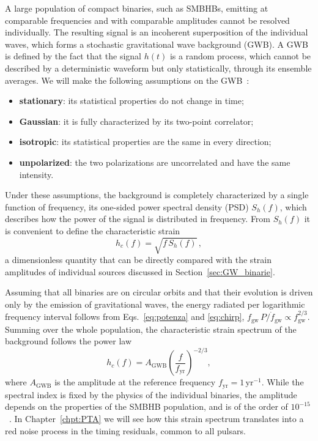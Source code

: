 A large population of compact binaries, such as SMBHBs, emitting at comparable
frequencies and with comparable amplitudes cannot be resolved individually.
The resulting signal is an incoherent superposition of the individual waves,
which forms a stochastic gravitational wave background (GWB).
A GWB is defined by the fact that the
signal $h(t)$ is a random process, which cannot be described by a
deterministic waveform but only statistically, through its ensemble averages.
We will make the following assumptions on the GWB~\cite{Maggiore2008}:
\begin{itemize}
    \item \textbf{stationary}: its statistical properties do not change in time;
    \item \textbf{Gaussian}: it is fully characterized by its two-point correlator;
    \item \textbf{isotropic}: its statistical properties are the same in every direction;
    \item \textbf{unpolarized}: the two polarizations are uncorrelated and have the same intensity.
\end{itemize}

Under these assumptions, the background is completely characterized by a
single function of frequency, its one-sided power spectral density (PSD)
$S_h(f)$, which describes how the power of the signal is distributed in
frequency. From $S_h(f)$ it is convenient to define the characteristic strain~\cite{Taylor2021}
\begin{equation}
    h_c(f) = \sqrt{f\,S_h(f)}\,,
    \label{eq:hc}
\end{equation}
a dimensionless quantity that can be directly compared with the strain
amplitudes of individual sources discussed in Section~\ref{sec:GW_binarie}.

Assuming that all binaries are on circular orbits and that their evolution is
driven only by the emission of gravitational waves, the energy radiated per
logarithmic frequency interval follows from Eqs.~\eqref{eq:potenza} and
\eqref{eq:chirp}, \mbox{$f_{\mathrm{gw}}\,P/\dot f_{\mathrm{gw}} \propto f_{\mathrm{gw}}^{2/3}$}. Summing over the whole
population, the characteristic strain spectrum of the background follows the
power law~\cite{Phinney2001,Taylor2021}
\begin{equation}
    h_c(f) = A_{\mathrm{GWB}} \left(\frac{f}{f_{\mathrm{yr}}}\right)^{-2/3} ,
    \label{eq:hc_powerlaw}
\end{equation}
where $A_{\mathrm{GWB}}$ is the amplitude at the reference frequency
$f_{\mathrm{yr}} = 1\,\mathrm{yr}^{-1}$. While the spectral index is fixed by
the physics of the individual binaries, the amplitude depends on the properties
of the SMBHB population, and is of the order of $10^{-15}$~\cite{EPTA2023_GWB,NANOGrav2023,PPTA2023,CPTA2023}.
In Chapter~\ref{chpt:PTA} we will see how this strain spectrum translates into
a red noise process in the timing residuals, common to all pulsars.